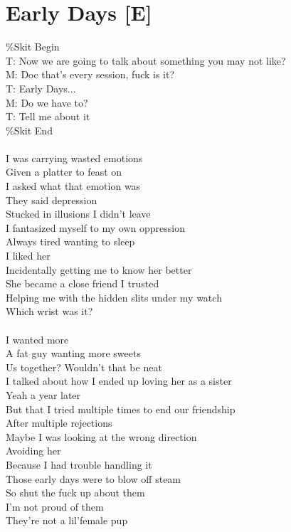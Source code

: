 \documentclass[12pt, b5paper, oneside]{book}
\begin{document}
\section{Early Days [E]}
\%Skit Begin
\\T: Now we are going to talk about something you may not like?
\\M: Doc that's every session, fuck is it?
\\T: Early Days...
\\M: Do we have to?
\\T: Tell me about it
\\\%Skit End
%
\\\\I was carrying wasted emotions
\\Given a platter to feast on
\\I asked what that emotion was
\\They said depression
\\Stucked in illusions I didn't leave
\\I fantasized myself to my own oppression
\\Always tired wanting to sleep
\\I liked her
\\Incidentally getting me to know her better
\\She became a close friend I trusted
\\Helping me with the hidden slits under my watch
\\Which wrist was it?
%
\\\\I wanted more
\\A fat guy wanting more sweets
\\Us together? Wouldn't that be neat
\\I talked about how I ended up loving her as a sister
\\Yeah a year later
\\But that I tried multiple times to end our friendship
\\After multiple rejections
\\Maybe I was looking at the wrong direction
\\Avoiding her
\\Because I had trouble handling it
\\Those early days were to blow off steam
\\So shut the fuck up about them
\\I'm not proud of them
\\They're not a lil'female pup
\end{document}
